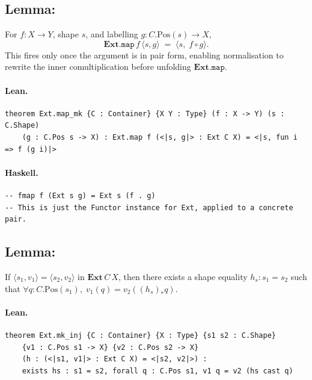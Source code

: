 \documentclass[11pt,a4paper]{article}
\begin{document}
\subsection{Lemma: }

\begin{prop}
For $f : X \to Y$, shape $s$, and labelling $g : C.\mathrm{Pos}(s) \to X$,
\[
  \mathbf{Ext}.\mathtt{map}\,f\,\langle s, g \rangle
  \;=\;
  \langle s,\; f \circ g \rangle.
\]
This fires only once the argument is in pair form, enabling normalisation to
rewrite the inner comultiplication before unfolding $\mathbf{Ext}.\mathtt{map}$.
\end{prop}

\paragraph{Lean.}
\begin{lstlisting}[style=lean]
theorem Ext.map_mk {C : Container} {X Y : Type} (f : X -> Y) (s : C.Shape)
    (g : C.Pos s -> X) : Ext.map f (<|s, g|> : Ext C X) = <|s, fun i => f (g i)|>
\end{lstlisting}

\paragraph{Haskell.}
\begin{lstlisting}[style=haskell]
-- fmap f (Ext s g) = Ext s (f . g)
-- This is just the Functor instance for Ext, applied to a concrete pair.
\end{lstlisting}


\subsection{Lemma: }

\begin{prop}
If $\langle s_1, v_1 \rangle = \langle s_2, v_2 \rangle$ in $\mathbf{Ext}\,C\,X$,
then there exists a shape equality $h_s : s_1 = s_2$ such that
$\forall q : C.\mathrm{Pos}(s_1),\; v_1(q) = v_2((h_s)_* q)$.
\end{prop}

\paragraph{Lean.}
\begin{lstlisting}[style=lean]
theorem Ext.mk_inj {C : Container} {X : Type} {s1 s2 : C.Shape}
    {v1 : C.Pos s1 -> X} {v2 : C.Pos s2 -> X}
    (h : (<|s1, v1|> : Ext C X) = <|s2, v2|>) :
    exists hs : s1 = s2, forall q : C.Pos s1, v1 q = v2 (hs cast q)
\end{lstlisting}
\end{document}
